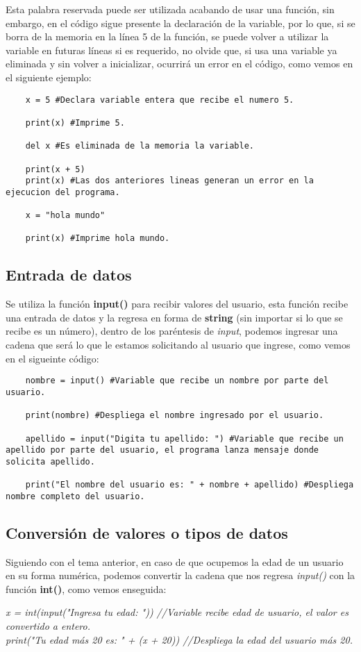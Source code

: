 Esta palabra reservada puede ser utilizada acabando de usar una función, sin embargo, en el código sigue presente la declaración de la variable, por lo que, si se borra de la memoria en la línea 5 de la función, se puede volver a utilizar la variable en futuras líneas si es requerido, no olvide que, si usa una variable ya eliminada y sin volver a inicializar, ocurrirá un error en el código, como vemos en el siguiente ejemplo:
\begin{lstlisting}
	x = 5 #Declara variable entera que recibe el numero 5.
	
	print(x) #Imprime 5.
	
	del x #Es eliminada de la memoria la variable.
	
	print(x + 5)
	print(x) #Las dos anteriores lineas generan un error en la ejecucion del programa.
	
	x = "hola mundo"
	
	print(x) #Imprime hola mundo.
\end{lstlisting}


\subsection{Entrada de datos}
\hspace{0.55cm}Se utiliza la función \textbf{input()} para recibir valores del usuario, esta función recibe una entrada de datos y la regresa en forma de \textbf{string} (sin importar si lo que se recibe es un número), dentro de los paréntesis de \textit{input}, podemos ingresar una cadena que será lo que le estamos solicitando al usuario que ingrese, como vemos en el sigueinte código:
\begin{lstlisting}
	nombre = input() #Variable que recibe un nombre por parte del usuario.
	
	print(nombre) #Despliega el nombre ingresado por el usuario.
	
	apellido = input("Digita tu apellido: ") #Variable que recibe un apellido por parte del usuario, el programa lanza mensaje donde solicita apellido.
	
	print("El nombre del usuario es: " + nombre + apellido) #Despliega nombre completo del usuario.
\end{lstlisting}


\subsection{Conversión de valores o tipos de datos}
\hspace{0.55cm}Siguiendo con el tema anterior, en caso de que ocupemos la edad de un usuario en su forma numérica, podemos convertir la cadena que nos regresa \textit{input()} con la función \textbf{int()}, como vemos enseguida:
\begin{center}
	\textit{x = int(input("Ingresa tu edad: ")) //Variable recibe edad de usuario, el valor es convertido a entero.\\print("Tu edad más 20 es: " + (x + 20)) //Despliega la edad del usuario más 20.}
\end{center}

